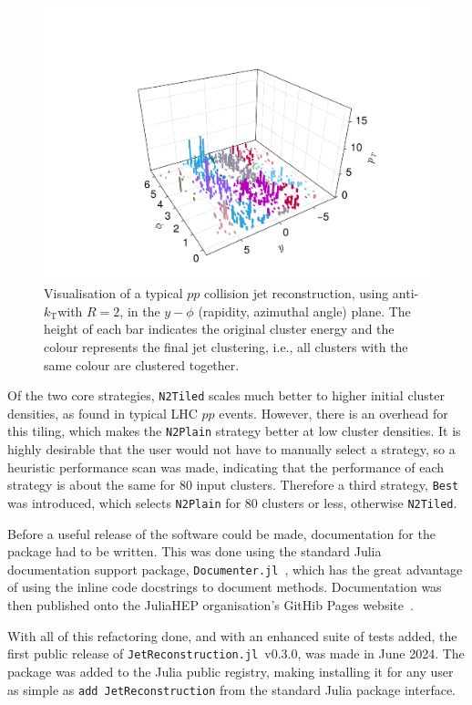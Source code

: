 \documentclass{webofc}
\newcommand{\akt}{anti-${k}_\text{T}$}
\newcommand{\JR}{\texttt{JetReconstruction.jl}}
\begin{document}
\begin{figure}[h]
    \begin{center}
        \includegraphics[width=0.6\linewidth]{jetvis-5-compact.pdf}
        \caption{Visualisation of a typical $pp$ collision jet reconstruction, using \akt with $R=2$, in the $y-\phi$ (rapidity, azimuthal angle) plane. The height of each bar indicates the original cluster energy and the colour represents the final jet clustering, i.e., all clusters with the same colour are clustered together.}
        \label{fig:jetvisplot}
    \end{center}
\end{figure}

Of the two core strategies, \texttt{N2Tiled} scales much better to higher
initial cluster densities, as found in typical LHC $pp$ events. However, there
is an overhead for this tiling, which makes the \texttt{N2Plain} strategy better
at low cluster densities. It is highly desirable that the user would not have to
manually select a strategy, so a heuristic performance scan was made, indicating
that the performance of each strategy is about the same for 80 input clusters.
Therefore a third strategy, \texttt{Best} was introduced, which selects
\texttt{N2Plain} for 80 clusters or less, otherwise \texttt{N2Tiled}.

Before a useful release of the software could be made, documentation for the
package had to be written. This was done using the standard Julia documentation
support package, \texttt{Documenter.jl}~\cite{documenter-jl}, which has the
great advantage of using the inline code docstrings to document methods.
Documentation was then published onto the JuliaHEP organisation's GitHib Pages
website~\cite{jetreco-docs}.

With all of this refactoring done, and with an enhanced suite of tests added,
the first public release of \JR\, v0.3.0, was made in June 2024. The package was
added to the Julia public registry, making installing it for any user as simple
as \texttt{add JetReconstruction} from the standard Julia package interface.
\end{document}
